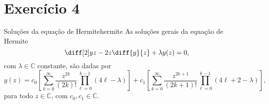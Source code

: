 \section*{Exercício 4}
\begin{proposition}{Soluções da equação de Hermite}{hermite}
    As soluções gerais da equação de Hermite
    \begin{equation*}
        \diff[2]yz - 2z\diff{y}{z} + \lambda y(z) = 0,
    \end{equation*}
    com \(\lambda \in \mathbb{C}\) constante, são dadas por
    \begin{equation*}
        y(z) = c_0\left[ \sum_{k = 0}^\infty \frac{z^{2k}}{(2k)!}\prod_{\ell = 0}^{k - 1} (4\ell - \lambda)\right] + c_1\left[ \sum_{k = 0}^\infty \frac{z^{2k + 1}}{(2k+1)!}\prod_{\ell = 0}^{k - 1} (4\ell + 2 - \lambda)\right],
    \end{equation*}
    para todo \(z \in \mathbb{C}\), com \(c_0, c_1 \in \mathbb{C}\).
\end{proposition}
